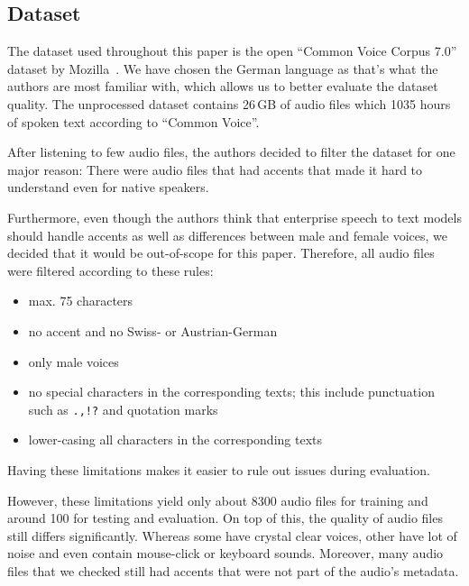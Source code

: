 \documentclass[11pt,a4paper]{article}
\begin{document}
\subsection{Dataset}
\label{subsec:dataset}

The dataset used throughout this paper is the open \enquote{Common Voice Corpus 7.0} dataset by Mozilla~\cite{commonvoice:2020}.
We have chosen the German language as that's what the authors are most familiar with, which allows us to better evaluate the dataset quality.
The unprocessed dataset contains 26\,GB of audio files which 1035 hours of spoken text according to \enquote{Common Voice}.

After listening to few audio files, the authors decided to filter the dataset for one major reason:
There were audio files that had accents that made it hard to understand even for native speakers.

Furthermore, even though the authors think that enterprise speech to text models
should handle accents as well as differences between male and female voices,
we decided that it would be out-of-scope for this paper.
Therefore, all audio files were filtered according to these rules:

\begin{itemize}
    \item max. 75 characters
    \item no accent and no Swiss- or Austrian-German
    \item only male voices
    \item no special characters in the corresponding texts;\newline 
          this include punctuation such as \texttt{.,!?} and quotation marks
    \item lower-casing all characters in the corresponding texts
\end{itemize}

Having these limitations makes it easier to rule out issues during evaluation.

However, these limitations yield only about 8300 audio files for training and around 100 for testing and evaluation.
On top of this, the quality of audio files still differs significantly.
Whereas some have crystal clear voices, other have lot of noise and even contain mouse-click or keyboard sounds.
Moreover, many audio files that we checked still had accents that were not part of the audio's metadata.
\end{document}
